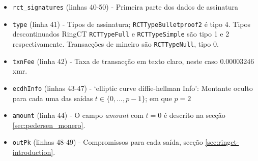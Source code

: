 \begin{itemize}
	\item {\tt rct\_signatures} (linhas 40-50) - Primeira parte dos dados de assinatura 
	\item {\tt type} (linha 41) - Tipos de assinatura; {\tt RCTTypeBulletproof2} é tipo 4. Tipos descontinuados RingCT {\tt RCTTypeFull} e {\tt RCTTypeSimple} são tipo 1 e 2 respectivamente. Transacções de mineiro são {\tt RCTTypeNull}, tipo 0.
	\item {\tt txnFee} (linha 42) - Taxa de transacção em texto claro, neste caso 0.00003246 xmr.
	\item {\tt ecdhInfo} (linhas 43-47) - ‘elliptic curve diffie-hellman Info’: 
Montante oculto para cada uma das saídas $t \in \{0, ..., p-1\}$; em que $p = 2$
    \item {\tt amount} (linha 44) - O campo {\sl amount} com $t = 0$ é descrito na secção \ref{sec:pedersen_monero}.
    \item {\tt outPk} (linhas 48-49) - Compromissos para cada saída, secção \ref{sec:ringct-introduction}.


\end{itemize}
